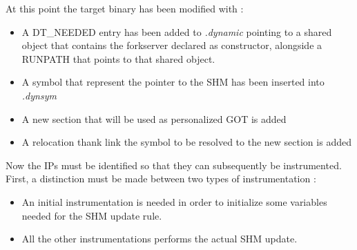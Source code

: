 At this point the target binary has been modified with :
\begin{itemize}
    \item A DT\_NEEDED entry has been added to \textit{.dynamic} pointing to a shared object that contains 
        the forkserver declared as constructor, alongside a RUNPATH that points to that shared object.
    \item A symbol that represent the pointer to the \gls{SHM} has been inserted into \textit{.dynsym}
    \item A new section that will be used as personalized \gls{GOT} is added
    \item A relocation thank link the symbol to be resolved to the new section is added
\end{itemize}
Now the \gls{IP}s must be identified so that they can subsequently be instrumented.
First, a distinction must be made between two types of instrumentation : 
\begin{itemize}
    \item An initial instrumentation is needed in order to initialize some variables needed for the \gls{SHM} update rule.
    \item All the other instrumentations performs the actual \gls{SHM} update.
\end{itemize}

